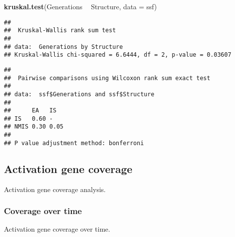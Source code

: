 \documentclass[]{book}
\newenvironment{Shaded}{\begin{snugshade}}{\end{snugshade}}
\newcommand{\DataTypeTok}[1]{\textcolor[rgb]{0.13,0.29,0.53}{#1}}
\newcommand{\KeywordTok}[1]{\textcolor[rgb]{0.13,0.29,0.53}{\textbf{#1}}}
\newcommand{\NormalTok}[1]{#1}
\newcommand{\OperatorTok}[1]{\textcolor[rgb]{0.81,0.36,0.00}{\textbf{#1}}}
\newcommand{\OtherTok}[1]{\textcolor[rgb]{0.56,0.35,0.01}{#1}}
\newcommand{\StringTok}[1]{\textcolor[rgb]{0.31,0.60,0.02}{#1}}
\begin{document}
\begin{Shaded}
\begin{Highlighting}[]
\KeywordTok{kruskal.test}\NormalTok{(Generations }\OperatorTok{~}\StringTok{ }\NormalTok{Structure, }\DataTypeTok{data =}\NormalTok{ ssf)}
\end{Highlighting}
\end{Shaded}

\begin{verbatim}
## 
##  Kruskal-Wallis rank sum test
## 
## data:  Generations by Structure
## Kruskal-Wallis chi-squared = 6.6444, df = 2, p-value = 0.03607
\end{verbatim}

\begin{Shaded}
\end{Shaded}

\begin{verbatim}
## 
##  Pairwise comparisons using Wilcoxon rank sum exact test 
## 
## data:  ssf$Generations and ssf$Structure 
## 
##      EA   IS  
## IS   0.60 -   
## NMIS 0.30 0.05
## 
## P value adjustment method: bonferroni
\end{verbatim}

\hypertarget{activation-gene-coverage-16}{%
\subsection{Activation gene coverage}\label{activation-gene-coverage-16}}

Activation gene coverage analysis.

\hypertarget{coverage-over-time-25}{%
\subsubsection{Coverage over time}\label{coverage-over-time-25}}

Activation gene coverage over time.
\end{document}
